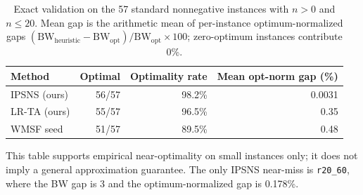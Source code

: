\begin{table}[t]
\centering
\caption{Exact validation on the 57 standard nonnegative instances with \(n>0\) and \(n\le 20\). Mean gap is the arithmetic mean of per-instance optimum-normalized gaps \((\mathrm{BW}_{\mathrm{heuristic}}-\mathrm{BW}_{\mathrm{opt}})/\mathrm{BW}_{\mathrm{opt}}\times 100\); zero-optimum instances contribute 0\%.}
\label{tab:exact-validation}
\begin{tabular}{lrrr}
\toprule
Method & Optimal & Optimality rate & Mean opt-norm gap (\%) \\
\midrule
IPSNS (ours) & 56/57 & 98.2\% & 0.0031 \\
LR-TA (ours) & 55/57 & 96.5\% & 0.35 \\
WMSF seed & 51/57 & 89.5\% & 0.48 \\
\bottomrule
\end{tabular}
\par\vspace{2pt}\parbox{0.94\linewidth}{\footnotesize This table supports empirical near-optimality on small instances only; it does not imply a general approximation guarantee. The only IPSNS near-miss is \texttt{r20\_60}, where the BW gap is 3 and the optimum-normalized gap is 0.178\%.}
\end{table}
